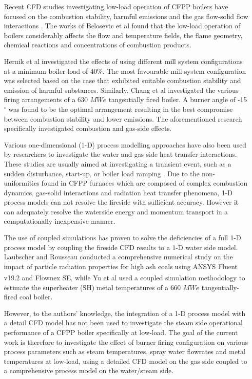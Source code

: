 \documentclass[twocolumn,10pt]{asme2ej}
\begin{document}
Recent CFD studies investigating low-load operation of CFPP boilers have focused on the combustion stability, harmful emissions and the gas flow-solid flow interactions \cite{Jiang2021}. The works of Belosevic et al \cite{Belosevic2019a} found that the low-load operation of boilers considerably affects the flow and temperature fields, the flame geometry, chemical reactions and concentrations of combustion products.

Hernik et al \cite{Hernik2020} investigated the effects of using different mill system configurations at a minimum boiler load of 40\%. The most favourable mill system configuration was selected based on the case that exhibited suitable combustion stability and emission of harmful substances. Similarly, Chang et al \cite{Chang2021} investigated the various firing arrangements of a 630 $MWe$ tangentially fired boiler. A burner angle of -15 $^\circ$ was found to be the optimal arrangement resulting in the best compromise between combustion stability and lower emissions. The aforementioned research specifically investigated combustion and gas-side effects.

Various one-dimensional (1-D) process modelling approaches have also been used by researchers to investigate the water and gas side heat transfer interactions. These studies are usually aimed at investigating a transient event, such as a sudden disturbance, start-up, or boiler load ramping \cite{Alobaid2017}. Due to the non-uniformities found in CFPP furnaces which are composed of complex combustion dynamics, gas-solid interactions and  radiation heat transfer phenomena, 1-D process models can not resolve the fireside with sufficient accuracy. However it can adequately resolve the waterside energy and momentum transport in a computationally inexpensive manner.

The use of coupled simulations has proven to solve the deficiencies of a full 1-D process model by coupling the fireside CFD results to a 1-D water side model. Laubscher and Rousseau \cite{Laubscher2020} conducted a comprehensive numerical study on the impact of particle radiation properties for high ash coals using ANSYS Fluent v19.2\textsuperscript{\textregistered} and Flownex SE\textsuperscript{\textregistered}, while Yu et al \cite{Yu2019} used a coupled simulation methodology to estimate the superheater (SH) metal temperatures of a 660 $MWe$ tangentially-fired coal boiler.

However, to the authors’ knowledge, the integration of a 1-D process model with a detail CFD model has not been used to investigate the steam side operational performance of a CFPP boiler specifically at low-load. The goal of the current work is therefore to investigate the effect of burner firing configuration on various process parameters such as steam temperatures, spray water flowrates and metal temperatures at low-load, using a detailed CFD model on the gas side coupled to a comprehensive process model on the water/steam side.
\end{document}
